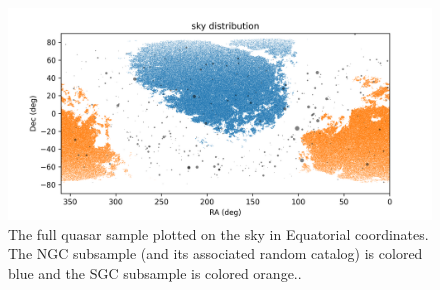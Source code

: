 \documentclass[modern]{aastex631}
\newlength{\widefigurewidth}
\newlength{\figurewidth}
\begin{document}
\begin{figure}[t!]
  \begin{mdframed}
  \color{captiongray}
  \begin{center}
    \includegraphics[width=\widefigurewidth]{notebooks/radec.png}
  \end{center}
    \caption{The full quasar sample plotted on the sky in Equatorial coordinates.
    The NGC subsample (and its associated random catalog) is colored blue and the SGC subsample is colored orange.\label{fig:radec}.}
  \end{mdframed}
\end{figure}
\end{document}
